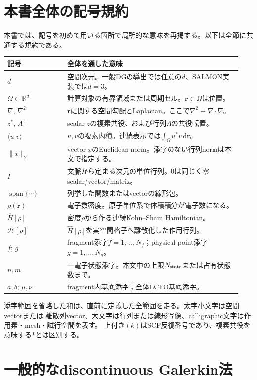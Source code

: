 \documentclass[11pt,a4paper]{article}
\newcommand{\dd}{\mathrm d}
\newcommand{\laplacian}{\nabla^2}
\begin{document}
\section*{本書全体の記号規約}
本書では、記号を初めて用いる箇所で局所的な意味を再掲する。以下は全節に共通する規約である。
\begin{longtable}{@{}p{0.24\linewidth}p{0.70\linewidth}@{}}
\toprule 記号 & 全体を通した意味 \\ \midrule
$d$ & 空間次元。一般DGの導出では任意の$d$、SALMON実装では$d=3$。\\
$\Omega\subset\mathbb R^d$ & 計算対象の有界領域または周期セル。$\boldsymbol r\in\Omega$は位置。\\
$\nabla$, $\laplacian$ & $\boldsymbol r$に関する空間勾配とLaplacian。ここで$\laplacian\equiv\nabla\!\cdot\!\nabla$。\\
$z^*$, $A^\dagger$ & scalar $z$の複素共役、および行列$A$の共役転置。\\
$\langle u|v\rangle$ & $u,v$の複素内積。連続表示では$\int_\Omega u^*v\,\dd\boldsymbol r$。\\
$\|x\|_2$ & vector $x$のEuclidean norm。添字のない行列normは本文で指定する。\\
$I$ & 文脈から定まる次元の単位行列。$0$は同じく零scalar/vector/matrix。\\
$\operatorname{span}\{\cdots\}$ & 列挙した関数またはvectorの線形包。\\
$\rho(\boldsymbol r)$ & 電子数密度。原子単位系で体積積分が電子数になる。\\
$\hat H[\rho]$ & 密度$\rho$から作る連続Kohn--Sham Hamiltonian。\\
$\mathcal H[\rho]$ & $\hat H[\rho]$を実空間格子へ離散化した作用行列。\\
$f$; $g$ & fragment添字$f=1,\ldots,N_f$；physical-point添字$g=1,\ldots,N_g$。\\
$n,m$ & 一電子状態添字。本文中の上限$N_{\rm state}$または占有状態数まで。\\
$a,b$; $\mu,\nu$ & fragment内基底添字；全体LCFO基底添字。\\
\bottomrule
\end{longtable}
添字範囲を省略した和は、直前に定義した全範囲を走る。太字小文字は空間vectorまたは
離散列vector、大文字は行列または線形写像、calligraphic文字は作用素・mesh・試行空間を表す。
上付き$(k)$はSCF反復番号であり、複素共役を意味する$*$とは区別する。

\section{一般的なdiscontinuous Galerkin法}
\end{document}
